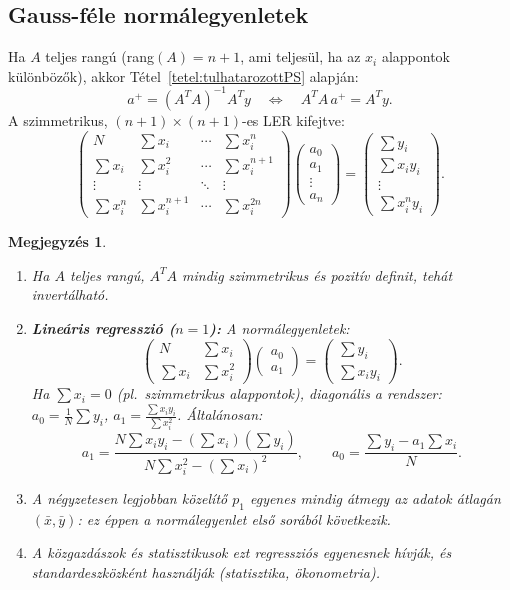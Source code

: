 \documentclass[a4paper,12pt]{article}
\theoremstyle{mydef}
\newtheorem{megjegyzes}[tetel]{Megjegyzés}
\begin{document}
\subsection*{Gauss-féle normálegyenletek}

Ha $A$ teljes rangú (rang$(A) = n+1$, ami teljesül, ha az $x_i$ alappontok különbözők),
akkor Tétel~\ref{tetel:tulhatarozottPS} alapján:
\[
  a^+ = (A^T A)^{-1} A^T y \quad \Longleftrightarrow \quad A^T A\,a^+ = A^T y.
\]
A szimmetrikus, $(n+1)\times(n+1)$-es LER kifejtve:
\[
  \begin{pmatrix}
    N & \sum x_i & \cdots & \sum x_i^n \\
    \sum x_i & \sum x_i^2 & \cdots & \sum x_i^{n+1} \\
    \vdots & \vdots & \ddots & \vdots \\
    \sum x_i^n & \sum x_i^{n+1} & \cdots & \sum x_i^{2n}
  \end{pmatrix}
  \begin{pmatrix} a_0 \\ a_1 \\ \vdots \\ a_n \end{pmatrix}
  =
  \begin{pmatrix} \sum y_i \\ \sum x_i y_i \\ \vdots \\ \sum x_i^n y_i \end{pmatrix}.
\]

\begin{megjegyzes}
\leavevmode
\begin{enumerate}[noitemsep,topsep=2pt]
  \item Ha $A$ teljes rangú, $A^T A$ mindig szimmetrikus és pozitív definit, tehát invertálható.
  \item \textbf{Lineáris regresszió ($n=1$):}
    A normálegyenletek:
    \[
      \begin{pmatrix} N & \sum x_i \\ \sum x_i & \sum x_i^2 \end{pmatrix}
      \begin{pmatrix} a_0 \\ a_1 \end{pmatrix}
      = \begin{pmatrix} \sum y_i \\ \sum x_i y_i \end{pmatrix}.
    \]
    Ha $\sum x_i = 0$ (pl.\ szimmetrikus alappontok), diagonális a rendszer:
    $a_0 = \tfrac{1}{N}\sum y_i$, $a_1 = \tfrac{\sum x_i y_i}{\sum x_i^2}$.
    Általánosan:
    \[
      a_1 = \frac{N\sum x_i y_i - (\sum x_i)(\sum y_i)}{N\sum x_i^2 - (\sum x_i)^2},
      \qquad
      a_0 = \frac{\sum y_i - a_1 \sum x_i}{N}.
    \]
  \item A négyzetesen legjobban közelítő $p_1$ egyenes mindig átmegy az adatok
        \emph{átlagán} $(\bar{x}, \bar{y})$: ez éppen a normálegyenlet első sorából következik.
  \item A közgazdászok és statisztikusok ezt \emph{regressziós egyenesnek} hívják,
        és standardeszközként használják (statisztika, ökonometria).
\end{enumerate}
\end{megjegyzes}
\end{document}
